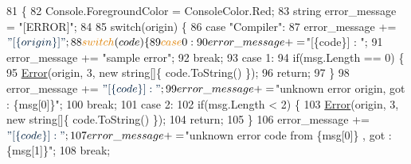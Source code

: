 \begin{DoxyCode}
81                                                                                  \{
82                     Console.ForegroundColor = ConsoleColor.Red;
83                     \textcolor{keywordtype}{string} error\_message = \textcolor{stringliteral}{"[ERROR]"};
84 
85                     \textcolor{keywordflow}{switch}(origin) \{
86                         \textcolor{keywordflow}{case} \textcolor{stringliteral}{"Compiler"}:
87                             error\_message += $\textcolor{stringliteral}{"[\{origin\}]"};
88                             \textcolor{keywordflow}{switch}(code) \{
89                                 \textcolor{keywordflow}{case} 0:
90                                     error\_message += $\textcolor{stringliteral}{"[\{code\}] : "};
91                                     error\_message += \textcolor{stringliteral}{"sample error"};
92                                     \textcolor{keywordflow}{break};
93                                 \textcolor{keywordflow}{case} 1:
94                                     \textcolor{keywordflow}{if}(msg.Length == 0) \{
95                                         \mbox{\hyperlink{class_compiler_1_1_compiler_af3467c4a37bb5379d3da14188042193c}{Error}}(origin, 3, \textcolor{keyword}{new} \textcolor{keywordtype}{string}[]\{ code.ToString() \});
96                                         \textcolor{keywordflow}{return};
97                                     \}
98                                     error\_message += $\textcolor{stringliteral}{"[\{code\}] : "};
99                                     error\_message += $\textcolor{stringliteral}{"unknown error origin, got : \{msg[0]\}"};
100                                     \textcolor{keywordflow}{break};
101                                 \textcolor{keywordflow}{case} 2:
102                                     \textcolor{keywordflow}{if}(msg.Length < 2) \{
103                                         \mbox{\hyperlink{class_compiler_1_1_compiler_af3467c4a37bb5379d3da14188042193c}{Error}}(origin, 3, \textcolor{keyword}{new} \textcolor{keywordtype}{string}[]\{ code.ToString() \});
104                                         \textcolor{keywordflow}{return};
105                                     \}
106                                     error\_message += $\textcolor{stringliteral}{"[\{code\}] : "};
107                                     error\_message += $\textcolor{stringliteral}{"unknown error code from \{msg[0]\} , got : \{msg[1]\}"};
108                                     \textcolor{keywordflow}{break};

\end{DoxyCode}

